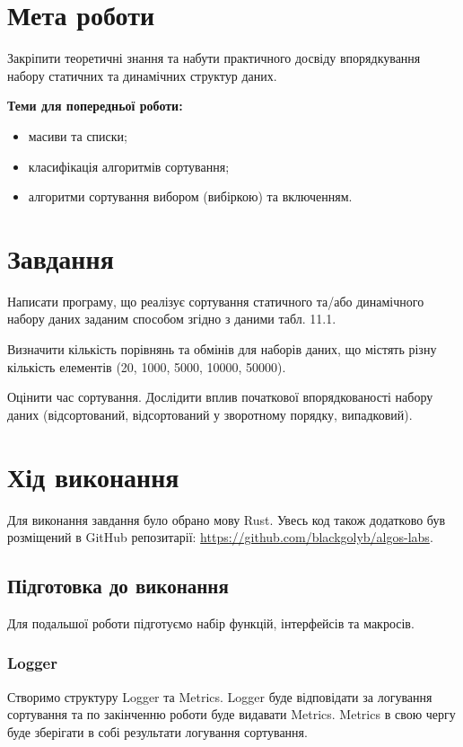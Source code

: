 \section{Мета роботи}
Закріпити теоретичні знання та набути практичного досвіду
впорядкування набору статичних та динамічних структур даних.

\noindent
\textbf{Теми для попередньої роботи:}
\begin{itemize}
    \item масиви та списки;
    \item класифікація алгоритмів сортування;
    \item алгоритми сортування вибором (вибіркою) та включенням.
\end{itemize}


\section{Завдання}
Написати програму, що реалізує сортування статичного та/або
динамічного набору даних заданим способом згідно з даними табл. 11.1.

Визначити кількість порівнянь та обмінів для наборів даних, що
містять різну кількість елементів (20, 1000, 5000, 10000, 50000).

Оцінити час сортування. Дослідити вплив початкової впорядкованості
набору даних (відсортований, відсортований у зворотному порядку,
випадковий).


\section{Хід виконання}
Для виконання завдання було обрано мову Rust.
Увесь код також додатково був розміщений в GitHub репозитарії: \href{https://github.com/blackgolyb/algos-labs}{https://github.com/blackgolyb/algos-labs}.


\newpage
\subsection{Підготовка до виконання}
Для подальшої роботи підготуємо набір функцій, інтерфейсів та макросів.

\subsubsection{Logger}
Створимо структуру Logger та Metrics.
Logger буде відповідати за логування сортування та по закінченню роботи буде видавати Metrics.
Metrics в свою чергу буде зберігати в собі результати логування сортування.


